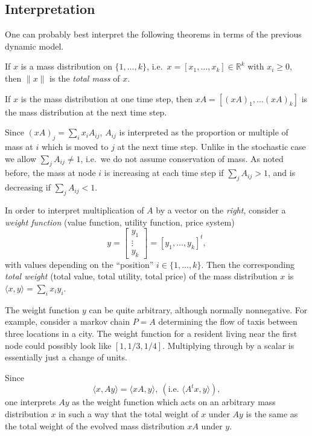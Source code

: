 \documentclass[a4paper]{amsart}
\theoremstyle{plain}
\theoremstyle{definition}
\theoremstyle{remark}
\begin{document}
\subsection{Interpretation}  One can probably best  interpret the following theorems in terms of the previous dynamic model.

\medskip If $   x $ is a mass distribution on $ \{1,\dots, k \} $, i.e.\  $ x =[x_1,\dots, x_k] \in \mathbb{R}^k $ with $ x_i \geq 0 $, then $ \|x\| $ is the \emph{total mass} of $x $. 

If $ x $ is the mass distribution   at one time step,  then $ x A =   [(x A)_1,\dots (x A)_k] $ is the mass distribution at the next time step.

Since $ (x A)_j = \sum_ix_i A_{ij} $,  $ A_{ij} $ is interpreted as the proportion or multiple of mass at  $ i $ which is moved to $ j $ at the next time step.  Unlike in the stochastic case we allow $ \sum_j A_{ij} \neq 1 $, i.e.\ we do not assume conservation of mass.  As noted before, the mass   at  node $ i $  is increasing at each time step  if $ \sum_j A_{ij} > 1 $, and is decreasing if  $ \sum_j A_{ij} < 1 $.  

\medskip
In order to interpret  multiplication of $ A $ by a vector on the \emph{right},   consider a \emph{weight function} (value function, utility function, price system)
\[
y = \begin{bmatrix} y_1 \\ \vdots \\ y_k \end{bmatrix} = [y_1,\dots, y_k]^t , 
\]
with values depending on the ``position'' $ i \in \{1,\dots, k\} $.   Then the corresponding \emph{total  weight} (total value, total utility, total price) of the mass distribution $ x $ is $ \langle x,y \rangle = \sum_ix_i y_i $. 

The weight function $ y $ can be quite arbitrary, although normally nonnegative.  For example, consider a markov chain $ P=A $ determining the flow of taxis between three locations in a city.  The weight function for a resident  
living near the first node could possibly look like $ [1, 1/3, 1/4] $.  Multiplying through by a scalar is essentially just a change of units.

\medskip Since 
\[
\langle x, Ay \rangle = \langle x A, y \rangle,\ ( \text{i.e.\ } \langle A^t x, y \rangle ),
\]
one interprets  $ Ay $ as the weight function which acts on an arbitrary mass distribution $ x $ in such a way that the total weight of $ x $ under $ Ay $ is the same as the total weight of  the evolved mass distribution $ xA  $ under $ y $.
\end{document}
